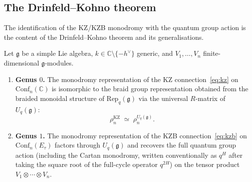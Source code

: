 \subsection{The Drinfeld--Kohno theorem}
\label{sec:drinfeld-kohno}

The identification of the KZ/KZB monodromy with the quantum group
action is the content of the Drinfeld--Kohno theorem and its
generalisations.

\begin{theorem}
\label{thm:drinfeld-kohno-appendix}
Let $\mathfrak{g}$ be a simple Lie algebra, $k \in \mathbb{C}
\setminus \{-h^\vee\}$ generic, and $V_1, \dots, V_n$
finite-dimensional $\mathfrak{g}$-modules.
\begin{enumerate}[label=\textup{(\roman*)}]
\item \textbf{Genus $0$.}
The monodromy representation of the KZ
connection~\eqref{eq:kz} on $\mathrm{Conf}_n(\mathbb{C})$
is isomorphic to the braid group representation obtained from the
braided monoidal structure of $\mathrm{Rep}_q(\mathfrak{g})$
via the universal $R$-matrix of $U_q(\mathfrak{g})$:
\begin{equation}\label{eq:dk-appendix}
\rho_n^{\mathrm{KZ}}
\;\simeq\;
\rho_n^{U_q(\mathfrak{g})}.
\end{equation}

\item \textbf{Genus $1$.}
The monodromy representation of the KZB
connection~\eqref{eq:kzb} on $\mathrm{Conf}_n(E_\tau)$
factors through $U_q(\mathfrak{g})$ and recovers the
full quantum group action \textup{(}including the Cartan monodromy,
written conventionally as $q^H$ after taking the square root of the
full-cycle operator $q^{2H}$\textup{)} on the tensor product
$V_1 \otimes \cdots \otimes V_n$.
\end{enumerate}
\end{theorem}

